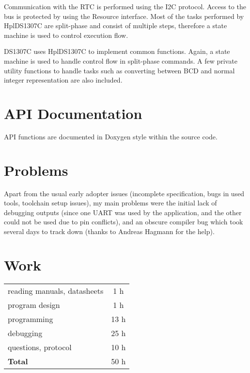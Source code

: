 \documentclass[12pt,a4paper,titlepage,oneside]{article}
\begin{document}
Communication with the RTC is performed using the I2C protocol. Access to the
bus is protected by using the Resource interface. Most of the tasks performed
by HplDS1307C are split-phase and consist of multiple steps, therefore a state
machine is used to control execution flow.

DS1307C uses HplDS1307C to implement common functions. Again, a state machine
is used to handle control flow in split-phase commands. A few private utility
functions to handle tasks such as converting between BCD and normal integer
representation are also included.


\section{API Documentation}

API functions are documented in Doxygen style within the source code.

\section{Problems}

Apart from the usual early adopter issues (incomplete specification, bugs in
used tools, toolchain setup issues), my main problems were the initial lack of
debugging outputs (since one UART was used by the application, and the other
could not be used due to pin conflicts), and an obscure compiler bug which took
several days to track down (thanks to Andreas Hagmann for the help).

\section{Work}

\begin{tabular}{|l|c|}
\hline
reading manuals, datasheets	& 1 h	\\
program design			& 1 h	\\
programming			& 13 h	\\
debugging			& 25 h	\\
questions, protocol		& 10 h	\\
\hline
{\bf Total}			& 50 h	\\
\hline
\end{tabular}
\end{document}
